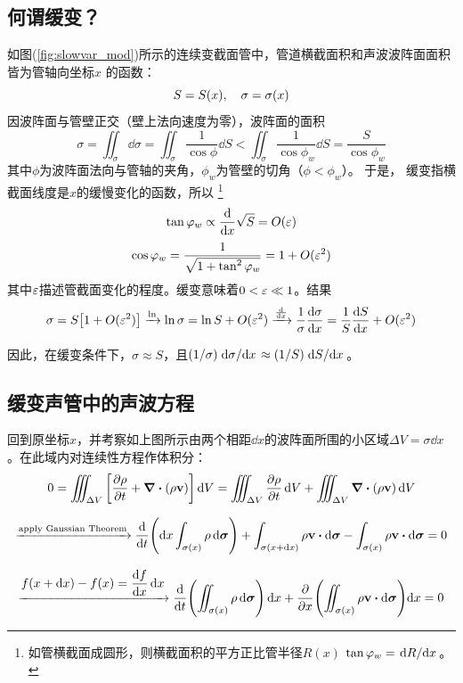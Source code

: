 \documentclass[UTF8]{ctexbook}
\begin{document}
\subsection{何谓缓变？}
如图(\ref{fig:slowvar_mod})所示的连续变截面管中，管道横截面积和声波波阵面面积皆为管轴向坐标$x$
的函数：
\begin{equation}
	S=S(x)\qc \sigma = \sigma (x)
\end{equation}
因波阵面与管壁正交（壁上法向速度为零），波阵面的面积
$$
\sigma = \iint_\sigma \dd{\sigma} = \iint_\sigma 
\frac{1}{\cos \phi} \dd{S} < \iint_\sigma \frac{1}{\cos\phi_w}\dd{S}
=\frac{S}{\cos\phi_w}$$
其中$\phi$为波阵面法向与管轴的夹角，$\phi_w$为管壁的切角（$\phi<\phi_w$）。
于是，
缓变指横截面线度是$x$的缓慢变化的函数，所以
\footnote{如管横截面成圆形，则横截面积的平方正比管半径$R(x)$
	$\tan\varphi_w = \dv*{R}{x}$。}
$$
\tan \varphi_w \propto \dv{x} \sqrt{S} = O(\varepsilon)
$$
$$\cos \varphi_w = \dfrac{1}{\sqrt{1+\tan^2 \varphi_w}} = 1+O(\varepsilon^2)
$$
其中$\varepsilon$描述管截面变化的程度。缓变意味着$0<\varepsilon \ll 1$。结果
\begin{equation}
	\label{eq:slowvar_approx}
	\sigma = S\qty[1+O(\varepsilon^2)] \xrightarrow{\ln} \ln \sigma = 
	\ln S+O(\varepsilon^2) \xrightarrow{\dv{x}} \frac1\sigma \dv{\sigma}{x}
	=\frac1S \dv{S}{x}  + O(\varepsilon^2)
\end{equation}

因此，在缓变条件下，$\sigma \approx S$，且$(1/\sigma ) \dv*{\sigma}{x}
\approx (1/S)\dv*{S}{x}$。

\subsection{缓变声管中的声波方程}
回到原坐标$x$，并考察如上图所示由两个相距$\dd{x}$的波阵面所围的小区域$
\Delta V=\sigma \dd{x}$。在此域内对连续性方程作体积分：
$$
0 = \iiint_{\Delta V} \qty[\pdv{\rho}{t} + \div(\rho\vb{v})] \dd{V}
=\iiint_{\Delta V} \pdv{\rho}{t} \dd{V} + \iiint_{\Delta V}\div (\rho \vb{v})
\dd{V}
$$

$$
\xrightarrow{\text{apply Gaussian Theorem}} \dv{t} \qty(\dd{x} \int_{\sigma
(x)} \rho \dd{\bm{\sigma}}) + \int_{\sigma (x+\dd{x})} 
\rho \vb{v}\vdot \dd{\bm{\sigma}} - \int_{\sigma(x)} \rho\vb{v} \vdot \dd
\bm{\sigma} = 0
$$

$$
\xrightarrow{\displaystyle f(x+\dd{x})-f(x) = \dv{f}{x} \dd{x}} 
\dv{t} \qty(\iint_{\sigma(x)} \rho \dd{\bm{\sigma}}) \dd{x}
+\pdv{x} \qty(\iint_{\sigma(x)} \rho \vb{v} \vdot \dd{\bm{\sigma}})\dd x
=0
$$
\end{document}

